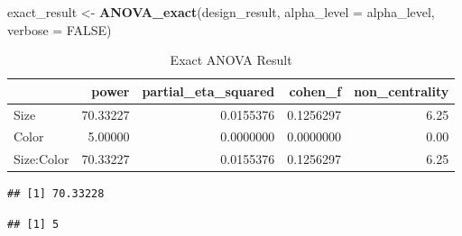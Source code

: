 \documentclass[
]{book}
\newenvironment{Shaded}{\begin{snugshade}}{\end{snugshade}}
\newcommand{\CommentTok}[1]{\textcolor[rgb]{0.56,0.35,0.01}{\textit{#1}}}
\newcommand{\DataTypeTok}[1]{\textcolor[rgb]{0.13,0.29,0.53}{#1}}
\newcommand{\KeywordTok}[1]{\textcolor[rgb]{0.13,0.29,0.53}{\textbf{#1}}}
\newcommand{\NormalTok}[1]{#1}
\newcommand{\OperatorTok}[1]{\textcolor[rgb]{0.81,0.36,0.00}{\textbf{#1}}}
\newcommand{\OtherTok}[1]{\textcolor[rgb]{0.56,0.35,0.01}{#1}}
\newcommand{\StringTok}[1]{\textcolor[rgb]{0.31,0.60,0.02}{#1}}
\begin{document}
\begin{Shaded}
\begin{Highlighting}[]
\NormalTok{exact_result <-}\StringTok{ }\KeywordTok{ANOVA_exact}\NormalTok{(design_result,}
                            \DataTypeTok{alpha_level =}\NormalTok{ alpha_level,}
                            \DataTypeTok{verbose =} \OtherTok{FALSE}\NormalTok{)}
\end{Highlighting}
\end{Shaded}

\begin{table}[!h]

\caption{\label{tab:unnamed-chunk-182}Exact ANOVA Result}
\centering
\begin{tabular}[t]{l|r|r|r|r}
\hline
  & power & partial\_eta\_squared & cohen\_f & non\_centrality\\
\hline
Size & 70.33227 & 0.0155376 & 0.1256297 & 6.25\\
\hline
Color & 5.00000 & 0.0000000 & 0.0000000 & 0.00\\
\hline
Size:Color & 70.33227 & 0.0155376 & 0.1256297 & 6.25\\
\hline
\end{tabular}
\end{table}

\begin{Shaded}
\end{Shaded}

\begin{verbatim}
## [1] 70.33228
\end{verbatim}

\begin{Shaded}
\end{Shaded}

\begin{verbatim}
## [1] 5
\end{verbatim}

\begin{Shaded}
\end{Shaded}
\end{document}
